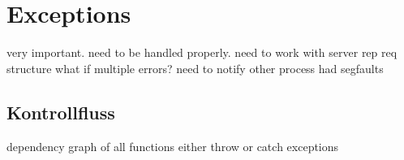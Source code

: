 



\section{Exceptions}

very important.
need to be handled properly.
need to work with server rep req structure
what if multiple errors?
need to notify other process
had segfaults



\subsection{Kontrollfluss}

dependency graph of all functions
either throw or catch exceptions


